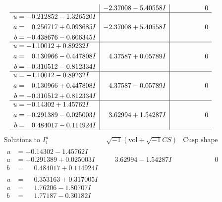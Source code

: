 \documentclass[1p]{elsarticle_modified}
\theoremstyle{definition}
\newcommand{\I}{\sqrt{-1}}
\begin{document}
$$\begin{array}{c|c|c}
 & -2.37008 - 5.40558 I & \phantom{-0.000000 } 0 \\ \hline\begin{aligned}
u &= -0.212852 - 1.326520 I \\
a &= \phantom{-}0.256717 + 0.093685 I \\
b &= -0.438676 - 0.606345 I\end{aligned}
 & -2.37008 + 5.40558 I & \phantom{-0.000000 } 0 \\ \hline\begin{aligned}
u &= -1.10012 + 0.89232 I \\
a &= \phantom{-}0.130966 - 0.447808 I \\
b &= -0.310512 - 0.812334 I\end{aligned}
 & \phantom{-}4.37587 + 0.05789 I & \phantom{-0.000000 } 0 \\ \hline\begin{aligned}
u &= -1.10012 - 0.89232 I \\
a &= \phantom{-}0.130966 + 0.447808 I \\
b &= -0.310512 + 0.812334 I\end{aligned}
 & \phantom{-}4.37587 - 0.05789 I & \phantom{-0.000000 } 0 \\ \hline\begin{aligned}
u &= -0.14302 + 1.45762 I \\
a &= -0.291389 - 0.025003 I \\
b &= \phantom{-}0.484017 - 0.114924 I\end{aligned}
 & \phantom{-}3.62994 + 1.54287 I & \phantom{-0.000000 } 0\\
 \hline 
 \end{array}$$\newpage$$\begin{array}{c|c|c}  
\text{Solutions to }I^u_{1}& \I (\text{vol} + \sqrt{-1}CS) & \text{Cusp shape}\\
 \hline 
\begin{aligned}
u &= -0.14302 - 1.45762 I \\
a &= -0.291389 + 0.025003 I \\
b &= \phantom{-}0.484017 + 0.114924 I\end{aligned}
 & \phantom{-}3.62994 - 1.54287 I & \phantom{-0.000000 } 0 \\ \hline\begin{aligned}
u &= \phantom{-}0.353163 + 0.317005 I \\
a &= \phantom{-}1.76206 - 1.80707 I \\
b &= \phantom{-}1.77187 - 0.30182 I\end{aligned}

\end{array}$$
\end{document}
